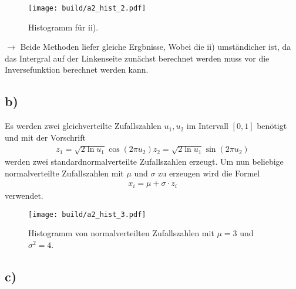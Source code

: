 \begin{figure}
  \texttt{[image: build/a2\_hist\_2.pdf]}
  \caption{Histogramm für ii).}
\end{figure}

$\rightarrow$ Beide Methoden liefer gleiche Ergbnisse, Wobei die ii) umständicher
ist, da das Intergral auf der Linkenseite zunächst berechnet werden muss vor die Inversefunktion
berechnet werden kann.


\subsection*{b)}
Es werden zwei gleichverteilte Zufallszahlen $u_1,u_2$ im Intervall $[0,1]$
benötigt und mit der Vorschrift
\begin{align}
  z_1=\sqrt{2\ln u_1}\cos(2\pi u_2)
  z_2=\sqrt{2\ln u_1}\sin(2\pi u_2)
\end{align}
werden zwei standardnormalverteilte
Zufallszahlen erzeugt.
Um nun beliebige normalverteilte
Zufallszahlen mit $\mu$ und $\sigma$ zu erzeugen
wird die Formel
\begin{align*}
x_i= \mu +\sigma\cdot z_i
\end{align*}
verwendet.

\begin{figure}
  \texttt{[image: build/a2\_hist\_3.pdf]}
  \caption{Histogramm von normalverteilten Zufallszahlen mit $\mu=3$ und $\sigma^2=4$.}
\end{figure}


\subsection*{c)}
